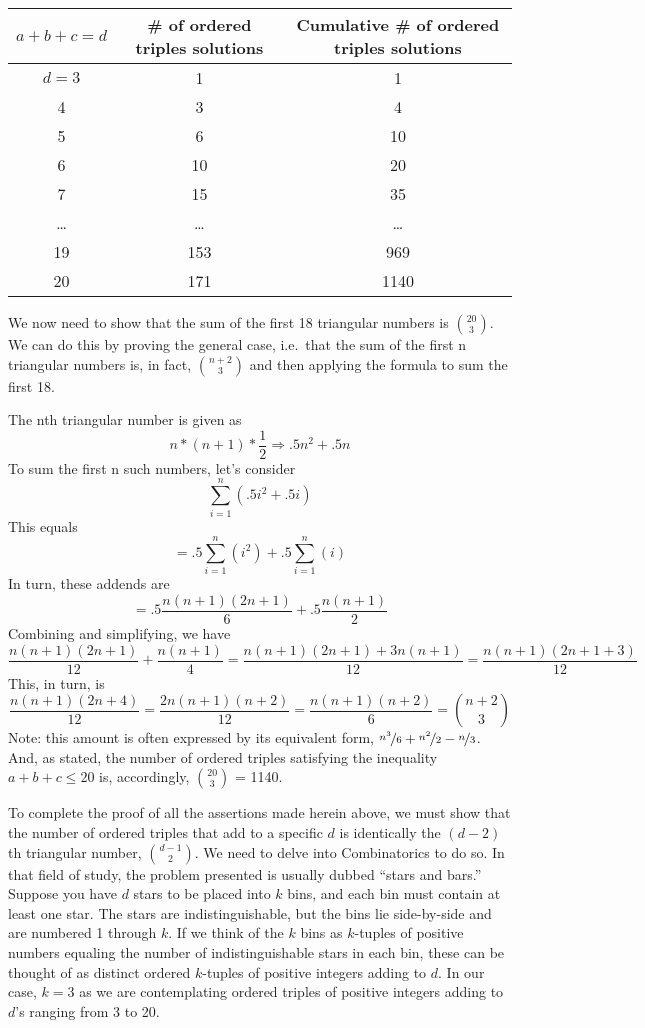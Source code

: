 \begin{center}
\begin{tabular}{c c c}
\toprule
\(a + b + c = d\) & \# of ordered triples solutions & Cumulative \# of ordered triples solutions \\
\midrule
\(d = 3\) & 1 & 1 \\
4 & 3 & 4 \\
5 & 6 & 10 \\
6 & 10 & 20 \\
7 & 15 & 35 \\
\ldots & \ldots & \ldots \\
19 & 153 & 969 \\
20 & 171 & 1140 \\
\bottomrule
\end{tabular}
\end{center}

We now need to show that the sum of the first 18 triangular numbers is \(\binom{20}{3}\). We can do this by proving the general case, i.e.\ that the sum of the first n triangular numbers is, in fact, \(\binom{n+2}{3}\) and then applying the formula to sum the first 18.

The nth triangular number is given as
\[n * (n+1) * \frac{1}{2} \Rightarrow .5n^2 + .5n\]
To sum the first n such numbers, let’s consider
\[\sum_{i=1}^{n}(.5i^2 + .5i)\]
This equals
\[= .5\sum_{i=1}^{n}(i^2) + .5\sum_{i=1}^{n}(i)\]
In turn, these addends are
\[= .5\frac{n(n + 1)(2n + 1)}{6} + .5\frac{n(n + 1)}{2}\]
Combining and simplifying, we have
\[\frac{n(n+1)(2n+1)}{12} + \frac{n(n+1)}{4} = \frac{n(n+1)(2n+1)+3n(n+1)}{12} = \frac{n(n+1)(2n+1+3)}{12}\]
This, in turn, is
\[\frac{n(n+1)(2n+4)}{12} = \frac{2n(n+1)(n+2)}{12} = \frac{n(n+1)(n+2)}{6} = \binom{n+2}{3}\]
Note: this amount is often expressed by its equivalent form, \(\nicefrac{n^3}{6} + \nicefrac{n^2}{2} - \nicefrac{n}{3}\). And, as stated, the number of ordered triples satisfying the inequality \(a + b + c \leq 20\) is, accordingly, \(\binom{20}{3}\) = 1140. 

To complete the proof of all the assertions made herein above, we must show that the number of ordered triples that add to a specific \(d\) is identically the \((d - 2)\)th triangular number, \(\binom{d-1}{2}\). We need to delve into Combinatorics to do so. In that field of study, the problem presented is usually dubbed “stars and bars.” Suppose you have \(d\) stars to be placed into \(k\) bins, and each bin must contain at least one star. The stars are indistinguishable, but the bins lie side-by-side and are numbered 1 through \(k\). If we think of the \(k\) bins as \(k\)-tuples of positive numbers equaling the number of indistinguishable stars in each bin, these can be thought of as distinct ordered \(k\)-tuples of positive integers adding to \(d\). In our case, \(k = 3\) as we are contemplating ordered triples of positive integers adding to \(d\)’s ranging from 3 to 20.

